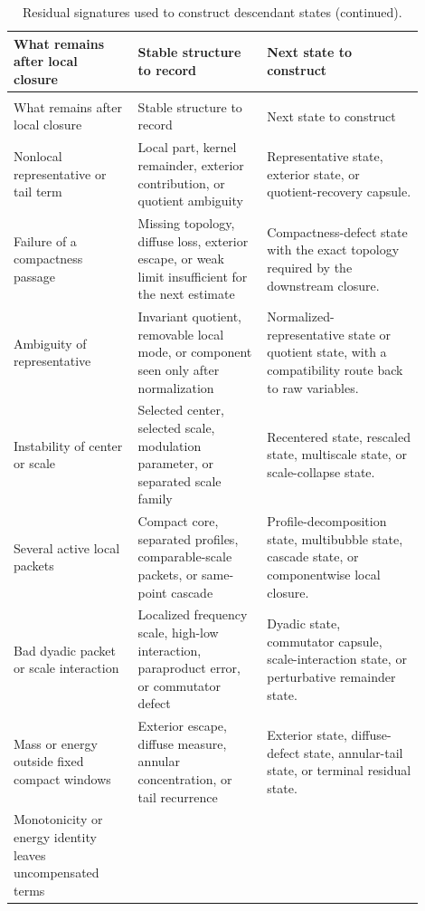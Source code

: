 \documentclass[11pt]{article}
\theoremstyle{plain}
\theoremstyle{definition}
\theoremstyle{remark}
\begin{document}
\begingroup
\small
\begin{longtable}{@{}L{0.27\linewidth}L{0.29\linewidth}L{0.34\linewidth}@{}}
\caption{Residual signatures used to construct descendant states.}
\label{tab:residual-promotion-signatures}\\
\toprule
What remains after local closure & Stable structure to record & Next state to construct \\
\midrule
\endfirsthead
\caption[]{Residual signatures used to construct descendant states (continued).}\\
\toprule
What remains after local closure & Stable structure to record & Next state to construct \\
\midrule
\endhead
Nonlocal representative or tail term &
Local part, kernel remainder, exterior contribution, or quotient ambiguity &
Representative state, exterior state, or quotient-recovery capsule. \\
\addlinespace
Failure of a compactness passage &
Missing topology, diffuse loss, exterior escape, or weak limit insufficient for the next estimate &
Compactness-defect state with the exact topology required by the downstream closure. \\
\addlinespace
Ambiguity of representative &
Invariant quotient, removable local mode, or component seen only after normalization &
Normalized-representative state or quotient state, with a compatibility route back to raw variables. \\
\addlinespace
Instability of center or scale &
Selected center, selected scale, modulation parameter, or separated scale family &
Recentered state, rescaled state, multiscale state, or scale-collapse state. \\
\addlinespace
Several active local packets &
Compact core, separated profiles, comparable-scale packets, or same-point cascade &
Profile-decomposition state, multibubble state, cascade state, or componentwise local closure. \\
\addlinespace
Bad dyadic packet or scale interaction &
Localized frequency scale, high-low interaction, paraproduct error, or commutator defect &
Dyadic state, commutator capsule, scale-interaction state, or perturbative remainder state. \\
\addlinespace
Mass or energy outside fixed compact windows &
Exterior escape, diffuse measure, annular concentration, or tail recurrence &
Exterior state, diffuse-defect state, annular-tail state, or terminal residual state. \\
\addlinespace
Monotonicity or energy identity leaves uncompensated terms &

\end{longtable}
\end{document}
